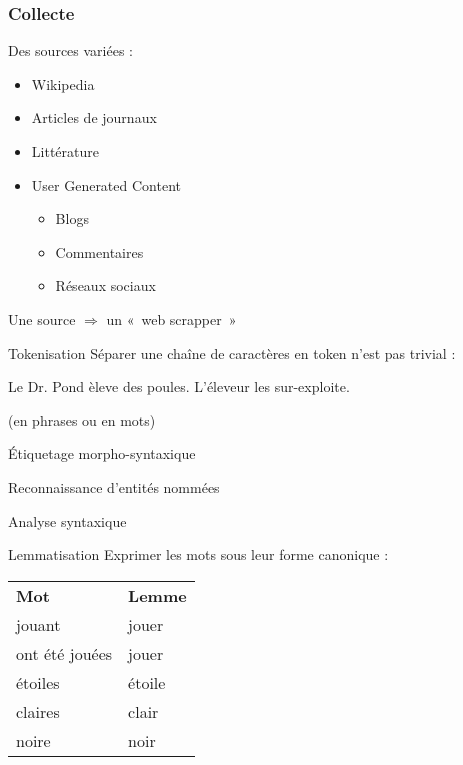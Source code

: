 \begin{frame}
  \frametitle{Collecte}
  Des sources variées :
  \begin{itemize}
  \item Wikipedia
  \item Articles de journaux
  \item Littérature
  \item User Generated Content
    \begin{itemize}
    \item Blogs
    \item Commentaires
    \item Réseaux sociaux
    \end{itemize}
  \end{itemize}
  Une source $\Rightarrow$ un «~web scrapper~»
\end{frame}

\begin{frame}{Tokenisation}
  Séparer une chaîne de caractères en token n'est pas trivial :

  \begin{center}
    Le Dr. Pond èleve des poules. L'éleveur les sur-exploite.
  \end{center}

  (en phrases ou en mots)
\end{frame}

\begin{frame}{Étiquetage morpho-syntaxique}
\end{frame}

\begin{frame}{Reconnaissance d'entités nommées}
\end{frame}

\begin{frame}{Analyse syntaxique}
\end{frame}

\begin{frame}{Lemmatisation}
  Exprimer les mots sous leur forme canonique : \\

  \begin{tabular}{ll}
    \textbf{Mot} & \textbf{Lemme} \\
    jouant & jouer \\
    ont été jouées & jouer \\
    étoiles & étoile \\
    claires & clair \\
    noire & noir
  \end{tabular}
\end{frame}

